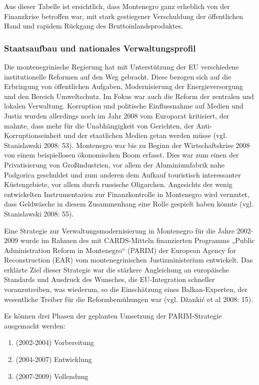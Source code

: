Aus dieser Tabelle ist ersichtlich, dass Montenegro ganz erheblich von der Finanzkrise betroffen war, mit stark gestiegener Verschuldung der öffentlichen Hand und rapidem Rückgang des Bruttoinlandsproduktes.

\subsubsection{Staatsaufbau und nationales Verwaltungsprofil}

Die montenegrinische Regierung hat mit Unterstützung der EU verschiedene institutionelle Reformen auf den Weg gebracht. Diese bezogen sich auf die Erbringung von öffentlichen Aufgaben, Modernisierung der Energieversorgung und den Bereich Umweltschutz. Im Fokus war auch die Reform der zentralen und lokalen Verwaltung. Korruption und politische Einflussnahme auf Medien und Justiz wurden allerdings noch im Jahr 2008 vom Europarat kritisiert, der mahnte, dass mehr für die Unabhängigkeit von Gerichten, der Anti-Korruptionseinheit und der staatlichen Medien getan werden müsse (vgl. Stanislawski 2008: 53). Montenegro war bis zu Beginn der Wirtschaftskrise 2008 von einem beispiellosen ökonomischen Boom erfasst. Dies war zum einen der Privatisierung von Großindustrien, vor allem der Aluminiumfabrik nahe Podgorica geschuldet und zum anderen dem Aufkauf touristisch interessanter Küstengebiete, vor allem durch russische Oligarchen. Angesichts der wenig entwickelten Instrumentarien zur Finanzkontrolle in Montenegro wird vermutet, dass Geldwäsche in diesem Zusammenhang eine Rolle gespielt haben könnte (vgl. Stanislawski 2008: 55).\par
Eine Strategie zur Verwaltungsmodernisierung in Montenegro für die Jahre 2002-2009 wurde im Rahmen des mit CARDS-Mitteln finanzierten Programms „Public Administration Reform in Montenegro“ (PARIM) der European Agency for Reconstruction (EAR) vom montenegrinischen Justizministerium entwickelt. Das erklärte Ziel dieser Strategie war die stärkere Angleichung an europäische Standards und Ausdruck des Wunsches, die EU-Integration schneller voranzutreiben, was wiederum, so die Einschätzung eines Balkan-Experten, der wesentliche Treiber für die Reformbemühungen war (vgl. Džankić et al 2008: 15).\par

Es können drei Phasen der geplanten Umsetzung der PARIM-Strategie ausgemacht werden:
\begin{enumerate}[label=Phase {\roman*}:,align=left,  leftmargin=*]
\item (2002-2004) Vorbereitung
\item (2004-2007) Entwicklung
\item  (2007-2009) Vollendung
\end{enumerate}

